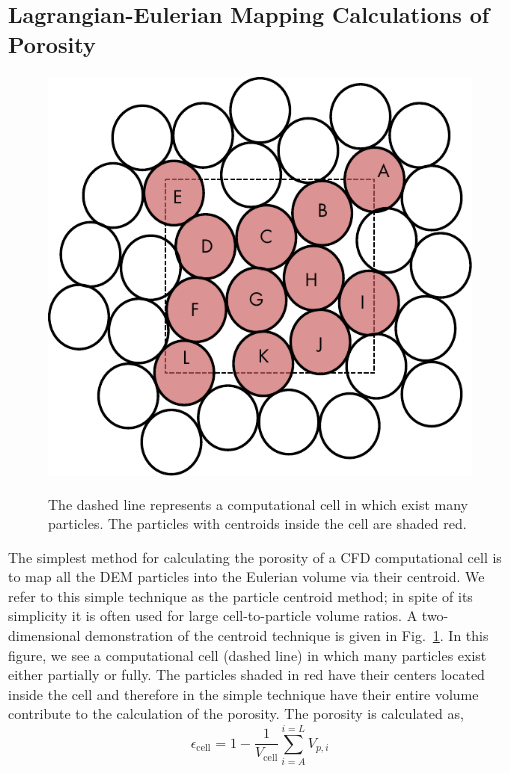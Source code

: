 \subsection{Lagrangian-Eulerian Mapping Calculations of Porosity}\label{sec:lag-eul-mapping}
\begin{figure}[t]
	\centering
	\caption{The dashed line represents a computational cell in which exist many particles. The particles with centroids inside the cell are shaded red.}
	\includegraphics[width=\singleimagewidth]{chapters/figures/void-fraction-cell.pdf}\label{fig:centroid-void-fraction}
\end{figure}
The simplest method for calculating the porosity of a CFD computational cell is to map all the DEM particles into the Eulerian volume via their centroid. We refer to this simple technique as the particle centroid method; in spite of its simplicity it is often used for large cell-to-particle volume ratios.\cite{Xu1997} A two-dimensional demonstration of the centroid technique is given in Fig.~\ref{fig:centroid-void-fraction}. In this figure, we see a computational cell (dashed line) in which many particles exist either partially or fully. The particles shaded in red have their centers located inside the cell and therefore in the simple technique have their entire volume contribute to the calculation of the porosity. The porosity is calculated as,
\begin{equation}
	\epsilon_\text{cell} = 1-\frac{1}{V_\text{cell}}\sum_{i = A}^{i=L}V_{p,i}
\end{equation}

